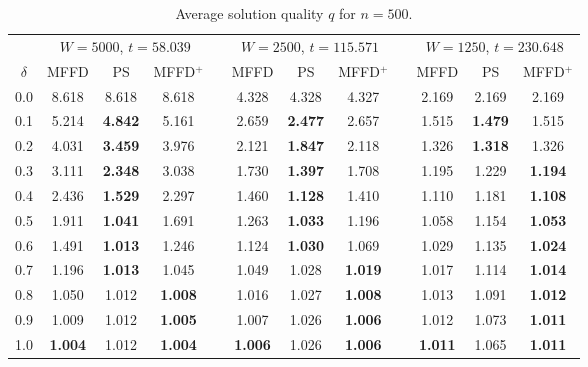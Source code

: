 \documentclass[runningheads]{llncs}
\begin{document}
\begin{table}[h!]
	\centering
	\caption{Average solution quality $q$ for $n = 500$.}
	\begin{tabular}{c@{\hspace{15pt}}c@{\hspace{7pt}}c@{\hspace{4pt}}ccc@{\hspace{7pt}}c@{\hspace{4pt}}ccc@{\hspace{7pt}}c@{\hspace{4pt}}c}\toprule
		& \multicolumn{3}{c}{$W = 5000$, $t = 58.039$} & \phantom{a} & \multicolumn{3}{c}{$W = 2500$, $t = 115.571$} & \phantom{a} & \multicolumn{3}{c}{$W = 1250$, $t = 230.648$} \\
		\cmidrule{2-4} \cmidrule{6-8} \cmidrule{10-12}
		$\delta$ & MFFD & PS & MFFD$^+$ && MFFD & PS & MFFD$^+$ && MFFD & PS & MFFD$^+$\\ \midrule
		0.0 & 8.618 & 8.618 & 8.618 && 4.328 & 4.328 & 4.327 && 2.169 & 2.169 & 2.169 \\
		0.1 & 5.214 & \textbf{4.842} & 5.161 && 2.659 & \textbf{2.477} & 2.657 && 1.515 & \textbf{1.479} & 1.515 \\
		0.2 & 4.031 & \textbf{3.459} & 3.976 && 2.121 & \textbf{1.847} & 2.118 && 1.326 & \textbf{1.318} & 1.326 \\
		0.3 & 3.111 & \textbf{2.348} & 3.038 && 1.730 & \textbf{1.397} & 1.708 && 1.195 & 1.229 & \textbf{1.194} \\
		0.4 & 2.436 & \textbf{1.529} & 2.297 && 1.460 & \textbf{1.128} & 1.410 && 1.110 & 1.181 & \textbf{1.108} \\
		0.5 & 1.911 & \textbf{1.041} & 1.691 && 1.263 & \textbf{1.033} & 1.196 && 1.058 & 1.154 & \textbf{1.053} \\
		0.6 & 1.491 & \textbf{1.013} & 1.246 && 1.124 & \textbf{1.030} & 1.069 && 1.029 & 1.135 & \textbf{1.024} \\
		0.7 & 1.196 & \textbf{1.013} & 1.045 && 1.049 & 1.028 & \textbf{1.019} && 1.017 & 1.114 & \textbf{1.014} \\
		0.8 & 1.050 & 1.012 & \textbf{1.008} && 1.016 & 1.027 & \textbf{1.008} && 1.013 & 1.091 & \textbf{1.012} \\
		0.9 & 1.009 & 1.012 & \textbf{1.005} && 1.007 & 1.026 & \textbf{1.006} && 1.012 & 1.073 & \textbf{1.011} \\
		1.0 & \textbf{1.004} & 1.012 & \textbf{1.004} && \textbf{1.006} & 1.026 & \textbf{1.006} && \textbf{1.011} & 1.065 & \textbf{1.011} \\
		\bottomrule
	\end{tabular}	
	\label{table:n=500}
\end{table}
\end{document}
